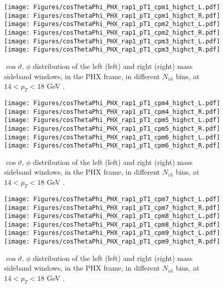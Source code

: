 \documentclass[12pt]{article}
\begin{document}

\begin{figure}[htbp]
\centering
\texttt{[image: Figures/cosThetaPhi\_PHX\_rap1\_pT1\_cpm1\_highct\_L.pdf]}
\texttt{[image: Figures/cosThetaPhi\_PHX\_rap1\_pT1\_cpm1\_highct\_R.pdf]}
\texttt{[image: Figures/cosThetaPhi\_PHX\_rap1\_pT1\_cpm2\_highct\_L.pdf]}
\texttt{[image: Figures/cosThetaPhi\_PHX\_rap1\_pT1\_cpm2\_highct\_R.pdf]}
\texttt{[image: Figures/cosThetaPhi\_PHX\_rap1\_pT1\_cpm3\_highct\_L.pdf]}
\texttt{[image: Figures/cosThetaPhi\_PHX\_rap1\_pT1\_cpm3\_highct\_R.pdf]}
\caption{$\cos\vartheta,\,\phi$ distribution of the left (left) and
  right (right) mass sideband windows, in the PHX frame, in different
  $N_{ch}$ bins, at $14 < p_{T} < 18$ GeV .}
\end{figure}
\clearpage

\begin{figure}[htbp]
\centering
\texttt{[image: Figures/cosThetaPhi\_PHX\_rap1\_pT1\_cpm4\_highct\_L.pdf]}
\texttt{[image: Figures/cosThetaPhi\_PHX\_rap1\_pT1\_cpm4\_highct\_R.pdf]}
\texttt{[image: Figures/cosThetaPhi\_PHX\_rap1\_pT1\_cpm5\_highct\_L.pdf]}
\texttt{[image: Figures/cosThetaPhi\_PHX\_rap1\_pT1\_cpm5\_highct\_R.pdf]}
\texttt{[image: Figures/cosThetaPhi\_PHX\_rap1\_pT1\_cpm6\_highct\_L.pdf]}
\texttt{[image: Figures/cosThetaPhi\_PHX\_rap1\_pT1\_cpm6\_highct\_R.pdf]}
\caption{$\cos\vartheta,\,\phi$ distribution of the left (left) and
  right (right) mass sideband windows, in the PHX frame, in different
  $N_{ch}$ bins, at $14 < p_{T} < 18$ GeV .}
\end{figure}
\clearpage

\begin{figure}[htbp]
\centering
\texttt{[image: Figures/cosThetaPhi\_PHX\_rap1\_pT1\_cpm7\_highct\_L.pdf]}
\texttt{[image: Figures/cosThetaPhi\_PHX\_rap1\_pT1\_cpm7\_highct\_R.pdf]}
\texttt{[image: Figures/cosThetaPhi\_PHX\_rap1\_pT1\_cpm8\_highct\_L.pdf]}
\texttt{[image: Figures/cosThetaPhi\_PHX\_rap1\_pT1\_cpm8\_highct\_R.pdf]}
\texttt{[image: Figures/cosThetaPhi\_PHX\_rap1\_pT1\_cpm9\_highct\_L.pdf]}
\texttt{[image: Figures/cosThetaPhi\_PHX\_rap1\_pT1\_cpm9\_highct\_R.pdf]}
\caption{$\cos\vartheta,\,\phi$ distribution of the left (left) and
  right (right) mass sideband windows, in the PHX frame, in different
  $N_{ch}$ bins, at $14 < p_{T} < 18$ GeV .}
\end{figure}
\clearpage
\end{document}
